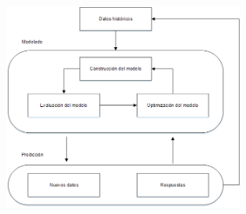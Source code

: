 \begin{figure}[H]
	\centering
	\includegraphics[width=0.7\textwidth]{03_GraphicFiles/p06.png}
	\label{fig:ml-pipeline}
\end{figure}


